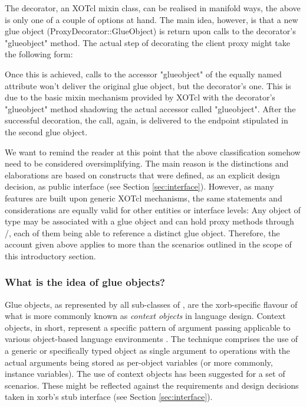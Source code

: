 

The decorator, an XOTcl mixin class, can be realised in manifold ways, the above is only one of a couple of options at hand. The main idea, however, is that a new glue object (ProxyDecorator::GlueObject) is return upon calls to the decorator's "glueobject" method. The actual step of decorating the client proxy might take the following form:



Once this is achieved, calls to the accessor "glueobject" of the equally named attribute won't deliver the original glue object, but the decorator's one. This is due to the basic mixin mechanism provided by XOTcl with the decorator's "glueobject" method shadowing the actual accessor called "glueobject". 
After the successful decoration, the call, again, is delivered to the endpoint stipulated in the second glue object.

We want to remind the reader at this point that the above classification somehow need to be considered oversimplifying. The main reason is the distinctions and elaborations are based on constructs that were defined, as an explicit design decision, as public interface (see Section \ref{sec:interface}). However,  as many features are built upon generic XOTcl mechanisms, the same statements and considerations are equally valid for other entities or interface levels: Any object of type  may be associated with a glue object and can hold proxy methods through /, each of them being able to reference a distinct glue object. Therefore, the account given above applies to more than the scenarios outlined in the scope of this introductory section.
  \subsubsection{What is the idea of glue objects?}\label{sec:advanced:xorb:gobjects:what}
  Glue objects, as represented by all sub-classes of , are the xorb-specific flavour of what is more commonly known as \emph{context objects} in language design. Context objects, in short, represent a specific pattern of argument passing applicable to various object-based language environments \cite{zdun:2005b}. The technique comprises the use of a generic or specifically typed object as single argument to operations with the actual arguments being stored as per-object variables (or more commonly, instance variables). The use of context objects has been suggested for a set of scenarios. These might be reflected against the requirements and design decisions taken in xorb's stub interface (see Section \ref{sec:interface}).
  
